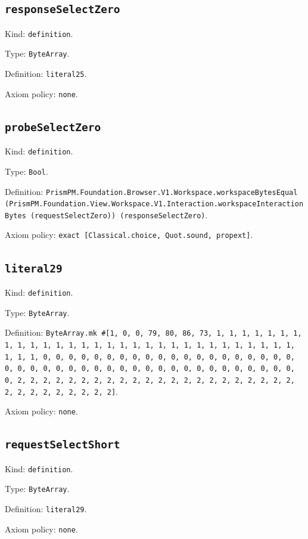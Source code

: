 \documentclass[11pt]{article}
\begin{document}
\subsection*{\texttt{responseSelectZero}}
\noindent Kind: \texttt{definition}.\par
\noindent Type: \texttt{ByteArray}.\par
\noindent Definition: \texttt{literal25}.\par
\noindent Axiom policy: \texttt{none}.\par
\subsection*{\texttt{probeSelectZero}}
\noindent Kind: \texttt{definition}.\par
\noindent Type: \texttt{Bool}.\par
\noindent Definition: \texttt{PrismPM.Foundation.Browser.V1.Workspace.workspaceBytesEqual (PrismPM.Foundation.View.Workspace.V1.Interaction.workspaceInteractionBytes (requestSelectZero)) (responseSelectZero)}.\par
\noindent Axiom policy: \texttt{exact [Classical.choice, Quot.sound, propext]}.\par
\subsection*{\texttt{literal29}}
\noindent Kind: \texttt{definition}.\par
\noindent Type: \texttt{ByteArray}.\par
\noindent Definition: \texttt{ByteArray.mk \#[1, 0, 0, 79, 80, 86, 73, 1, 1, 1, 1, 1, 1, 1, 1, 1, 1, 1, 1, 1, 1, 1, 1, 1, 1, 1, 1, 1, 1, 1, 1, 1, 1, 1, 1, 1, 1, 1, 1, 1, 0, 0, 0, 0, 0, 0, 0, 0, 0, 0, 0, 0, 0, 0, 0, 0, 0, 0, 0, 0, 0, 0, 0, 0, 0, 0, 0, 0, 0, 0, 0, 0, 0, 0, 0, 0, 0, 0, 0, 0, 0, 0, 0, 0, 2, 2, 2, 2, 2, 2, 2, 2, 2, 2, 2, 2, 2, 2, 2, 2, 2, 2, 2, 2, 2, 2, 2, 2, 2, 2, 2, 2, 2, 2, 2]}.\par
\noindent Axiom policy: \texttt{none}.\par
\subsection*{\texttt{requestSelectShort}}
\noindent Kind: \texttt{definition}.\par
\noindent Type: \texttt{ByteArray}.\par
\noindent Definition: \texttt{literal29}.\par
\noindent Axiom policy: \texttt{none}.\par
\end{document}
